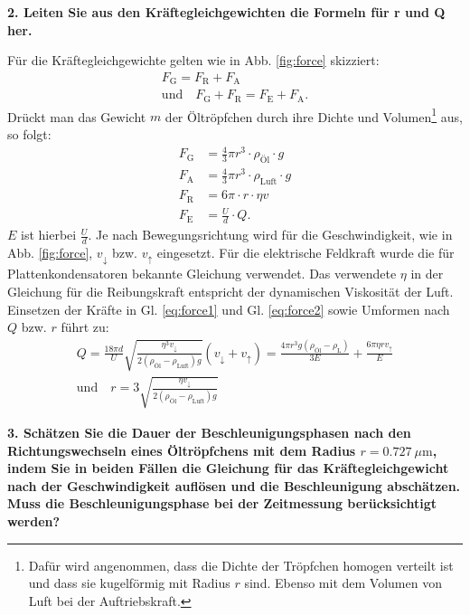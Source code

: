 \vspace{0,5cm}
\noindent \textbf{2. Leiten Sie aus den Kräftegleichgewichten die Formeln für r und Q her.}

	Für die Kräftegleichgewichte gelten wie in Abb. \ref{fig:force} skizziert:
	\begin{align}
		\label{eq:force1}
		F_\text{G} = F_\text{R} + F_\text{A} \\
		\label{eq:force2}
		\text{und} \quad F_\text{G} + F_\text{R} = F_\text{E} + F_\text{A}.
	\end{align}
	Drückt man das Gewicht $m$ der Öltröpfchen durch ihre Dichte und Volumen\footnote{Dafür wird angenommen, dass die Dichte der Tröpfchen homogen verteilt ist und dass sie kugelförmig mit Radius $r$ sind. Ebenso mit dem Volumen von Luft bei der Auftriebskraft.} aus, so folgt:
	\begin{align}
		F_\text{G} &= \frac{4}{3}\pi r^3 \cdot \rho_\text{Öl} \cdot g\\
		F_\text{A} &= \frac{4}{3}\pi r^3 \cdot \rho_\text{Luft} \cdot g\\
		F_\text{R} &= 6\pi \cdot r \cdot \eta v\\
		F_\text{E} &= \frac{U}{d} \cdot Q. \label{eq:eForce}
	\end{align}
	$E$ ist hierbei $\frac{U}{d}$. 
	Je nach Bewegungsrichtung wird für die Geschwindigkeit, wie in Abb. \ref{fig:force}, $v_{\downarrow}$ bzw. $v_{\uparrow}$ eingesetzt. 
	Für die elektrische Feldkraft wurde die für Plattenkondensatoren bekannte Gleichung verwendet. Das verwendete $\eta$ in der Gleichung für die Reibungskraft entspricht der dynamischen Viskosität der Luft.
	Einsetzen der Kräfte in Gl. \ref{eq:force1} und Gl. \ref{eq:force2} sowie Umformen nach $Q$ bzw. $r$ führt zu:
	\begin{align}
		\label{eq:Ladung}
		Q = \frac{18\pi d}{U} \sqrt{\frac{\eta^3 v_\downarrow}{2(\rho_\text{Öl}-\rho_\text{Luft})g}}(v_\downarrow + v_\uparrow) = \frac{4\pi r^3g(\rho_\text{Öl}-\rho_\text{L})}{3E}+ \frac{6\pi \eta r v_\uparrow}{E} \\
		\text{und} \quad r = 3 \sqrt{\frac{\eta v_\downarrow}{2(\rho_\text{Öl}-\rho_\text{Luft})g}}
	\end{align}
	
\vspace{0,5cm}
\noindent \textbf{3. Schätzen Sie die Dauer der Beschleunigungsphasen nach den Richtungswechseln eines Öltröpfchens mit dem Radius $r = \SI{0,727}{\mu\m}$, indem Sie in beiden Fällen die Gleichung für das Kräftegleichgewicht nach der Geschwindigkeit auflösen und die Beschleunigung abschätzen. Muss die Beschleunigungsphase bei der Zeitmessung berücksichtigt werden?}

